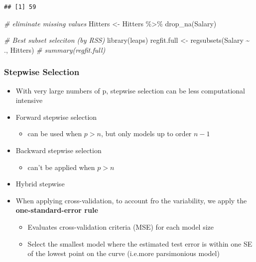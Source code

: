 \documentclass[
]{book}
\newenvironment{Shaded}{\begin{snugshade}}{\end{snugshade}}
\newcommand{\CommentTok}[1]{\textcolor[rgb]{0.56,0.35,0.01}{\textit{#1}}}
\newcommand{\FunctionTok}[1]{\textcolor[rgb]{0.00,0.00,0.00}{#1}}
\newcommand{\NormalTok}[1]{#1}
\newcommand{\OtherTok}[1]{\textcolor[rgb]{0.56,0.35,0.01}{#1}}
\newcommand{\SpecialCharTok}[1]{\textcolor[rgb]{0.00,0.00,0.00}{#1}}
\providecommand{\tightlist}{%
  \setlength{\itemsep}{0pt}\setlength{\parskip}{0pt}}
\begin{document}
\begin{Shaded}
\end{Shaded}

\begin{verbatim}
## [1] 59
\end{verbatim}

\begin{Shaded}
\begin{Highlighting}[]
\CommentTok{\# eliminate missing values }
\NormalTok{Hitters }\OtherTok{\textless{}{-}}\NormalTok{ Hitters }\SpecialCharTok{\%\textgreater{}\%} 
    \FunctionTok{drop\_na}\NormalTok{(Salary)}

\CommentTok{\# Best subset seleciton (by RSS)}
\FunctionTok{library}\NormalTok{(leaps)}
\NormalTok{regfit.full }\OtherTok{\textless{}{-}} \FunctionTok{regsubsets}\NormalTok{(Salary }\SpecialCharTok{\textasciitilde{}}\NormalTok{ ., Hitters)}
\CommentTok{\# summary(regfit.full)}
\end{Highlighting}
\end{Shaded}

\hypertarget{stepwise-selection}{%
\subsubsection{Stepwise Selection}\label{stepwise-selection}}

\begin{itemize}
\item
  With very large numbers of p, stepwise selection can be less computational intensive
\item
  Forward stepwise selection

  \begin{itemize}
  \tightlist
  \item
    can be used when \(p >n\), but only models up to order \(n-1\)
  \end{itemize}
\item
  Backward stepwise selection

  \begin{itemize}
  \tightlist
  \item
    can't be applied when \(p>n\)
  \end{itemize}
\item
  Hybrid stepwise
\item
  When applying cross-validation, to account fro the variability, we apply the \textbf{one-standard-error rule}

  \begin{itemize}
  \item
    Evaluates cross-validation criteria (MSE) for each model size
  \item
    Select the smallest model where the estimated test error is within one SE of the lowest point on the curve (i.e.more parsimonious model)
  \end{itemize}
\end{itemize}
\end{document}
